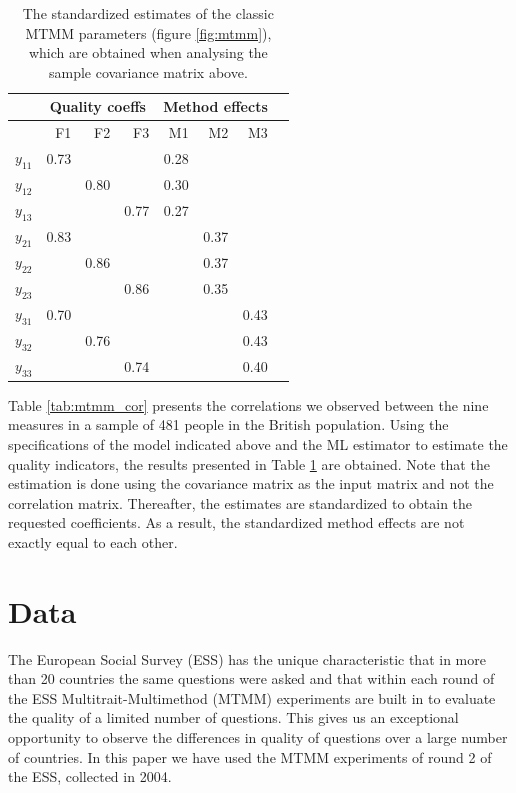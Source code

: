 \documentclass[a4paper,12pt]{article}
\begin{document}
\begin{table}[htb]\centering\caption{The standardized estimates of the classic MTMM parameters (figure \ref{fig:mtmm}), which are obtained when analysing the sample covariance matrix above.\label{tab:mtmm_results}}
\begin{tabular}{lrrrrrrr}
\hline
&   \multicolumn{3}{c}{Quality coeffs} & \multicolumn{3}{c}{Method effects} \\
\hline
    & F1 & F2 & F3 & M1 & M2 & M3 \\ 
 $y_{11}$ &   0.73& & & 0.28\\
$y_{12}$ &  & 0.80 & & 0.30\\
$y_{13}$ &  && 0.77 & 0.27\\
$y_{21}$ &   0.83 &&&& 0.37\\
$y_{22}$ &  & 0.86 &&& 0.37\\
$y_{23}$ &  && 0.86 && 0.35\\
$y_{31}$ &   0.70 &&&&& 0.43\\
$y_{32}$ &  & 0.76 &&&& 0.43\\
$y_{33}$ &  && 0.74 &&& 0.40\\
\hline
\end{tabular}
\end{table}

Table \ref{tab:mtmm_cor} presents the correlations we observed between the nine measures in a sample of 481 people in the British population. Using the specifications of the model indicated above and the ML estimator to estimate the quality indicators, the results presented in Table \ref{tab:mtmm_results} are obtained. Note that the estimation is done using the covariance matrix as the input matrix and not the correlation matrix. Thereafter, the estimates are standardized to obtain the requested coefficients. As a result, the standardized method effects are not exactly equal to each other.  

\clearpage

\section{Data}

The European Social Survey (ESS) has the unique characteristic that in more than 20 countries the same questions were asked and that within each round of the ESS Multitrait-Multimethod (MTMM) experiments are built in to evaluate the quality of a limited number of questions. This gives us an exceptional opportunity to observe the differences in quality of questions over a large number of countries. In this paper we have used the MTMM experiments of round 2 of the ESS, collected in 2004. 
\end{document}
